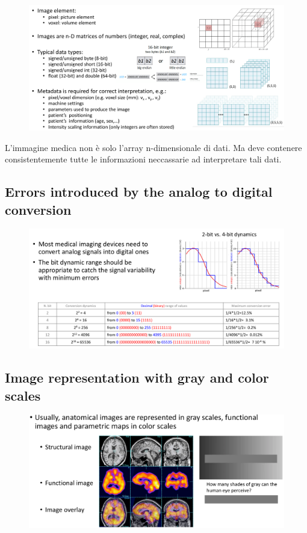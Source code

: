 \begin{figure}[ht]
	\centering
	\includegraphics[width=1\linewidth]{figure_med/datadim}

\end{figure}
\FloatBarrier


L'immagine medica non è solo l'array n-dimensionale di dati. Ma deve contenere consistentemente tutte le informazioni neccassarie ad interpretare tali dati.

\subsection{Errors introduced by the analog to digital conversion}

\begin{figure}[ht]
	\centering
	\includegraphics[width=0.9\linewidth]{figure_med/adc}
	
\end{figure}
\FloatBarrier


\subsection{Image representation with gray and color scales}


\begin{figure}[ht]
	\centering
	\includegraphics[width=0.9\linewidth]{figure_med/gray}
\end{figure}
\FloatBarrier


